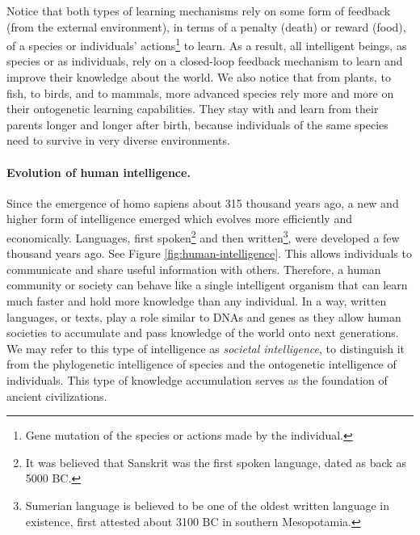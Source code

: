 \documentclass[../../book-main.tex]{subfiles}
\begin{document}
Notice that both types of learning mechanisms rely on some form of feedback (from the external environment), in terms of a penalty (death) or reward (food), of a species or individuals' actions\footnote{Gene mutation of the species or actions made by the individual.} to learn. As a result, all intelligent beings, as species or as individuals, rely on a closed-loop feedback mechanism to learn and improve their knowledge about the world. We also notice that from plants, to fish, to birds, and to mammals, more advanced species rely more and more on their ontogenetic learning capabilities. They stay with and learn from their parents longer and longer after birth, because individuals of the same species need to survive in very diverse environments. 

\paragraph{Evolution of human intelligence.}
Since the emergence of homo sapiens about 315 thousand years ago, a new and higher form of intelligence emerged which evolves more efficiently and economically. Languages, first spoken\footnote{It was believed that Sanskrit was the first spoken language, dated as back as 5000 BC.} and then written\footnote{Sumerian language is believed to be one of the oldest written language in existence, first attested about 3100 BC in southern Mesopotamia.}, were developed a few thousand years ago. See Figure \ref{fig:human-intelligence}. This allows individuals to communicate and share useful information with others. Therefore, a human community or society can behave like a single intelligent organism that can learn much faster and hold more knowledge than any individual. In a way, written languages, or texts, play a role similar to DNAs and genes as they allow human societies to accumulate and pass knowledge of the world onto next generations. We may refer to this type of intelligence as {\em  societal intelligence}, to distinguish it from the phylogenetic intelligence of species and the ontogenetic intelligence of individuals. This type of knowledge accumulation serves as the foundation of ancient civilizations.
\end{document}
